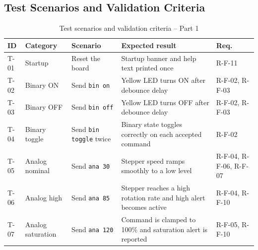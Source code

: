\documentclass[12pt]{article}
\begin{document}
\subsection{Test Scenarios and Validation Criteria}
{\scriptsize
\renewcommand{\arraystretch}{0.96}
\begin{table}[H]
\centering
\begin{tabular}{p{0.8cm} p{2.0cm} p{3.8cm} p{3.8cm} p{0.9cm}}
\toprule
\textbf{ID} & \textbf{Category} & \textbf{Scenario} & \textbf{Expected result} & \textbf{Req.} \\
\midrule
T-01 & Startup & Reset the board & Startup banner and help text printed once & R-F-11 \\
T-02 & Binary ON & Send \texttt{bin on} & Yellow LED turns ON after debounce delay & R-F-02, R-F-03 \\
T-03 & Binary OFF & Send \texttt{bin off} & Yellow LED turns OFF after debounce delay & R-F-02, R-F-03 \\
T-04 & Binary toggle & Send \texttt{bin toggle} twice & Binary state toggles correctly on each accepted command & R-F-02 \\
T-05 & Analog nominal & Send \texttt{ana 30} & Stepper speed ramps smoothly to a low level & R-F-04, R-F-06, R-F-07 \\
T-06 & Analog high & Send \texttt{ana 85} & Stepper reaches a high rotation rate and high alert becomes active & R-F-04, R-F-10 \\
T-07 & Analog saturation & Send \texttt{ana 120} & Command is clamped to 100\% and saturation alert is reported & R-F-05, R-F-10 \\
\bottomrule
\end{tabular}
\caption{Test scenarios and validation criteria -- Part 1}
\label{tab:tests1}
\end{table}

}
\end{document}
